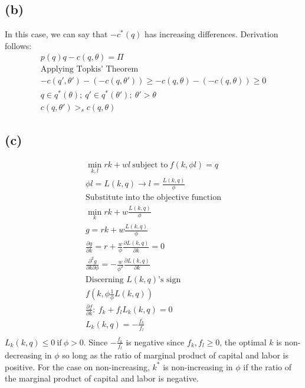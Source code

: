 \documentclass[10pt, a4paper]{article}
\begin{document}
    \subsection*{(b)}
      In this case, we can say that $-c^*(q)$ has increasing differences. Derivation follows:
      \begin{gather*}
        p(q)q - c(q,\theta) = \Pi \\
        \text{Applying Topkis' Theorem} \\
        -c(q',\theta')-(-c(q,\theta')) \geq -c(q,\theta)-(-c(q,\theta)) \geq 0 \\
        q\in q^*(\theta); \ q'\in q^*(\theta'); \ \theta' > \theta \\
        c(q,\theta') >_s c(q,\theta)
      \end{gather*}
    \subsection*{(c)}
      \begin{gather*}
        \min_{k,l} rk+wl \ \text{subject to} \ f(k,\phi l) = q \\
        \phi l = L(k,q) \rightarrow l = \frac{L(k,q)}{\phi} \\
        \text{Substitute into the objective function} \\
        \min_{k} rk + w\frac{L(k,q)}{\phi} \\
        g = rk + w\frac{L(k,q)}{\phi} \\
        \frac{\partial g}{\partial k} = r + \frac{w}{\phi}\frac{\partial L(k,q)}{\partial k} = 0 \\
        \frac{\partial^2 g}{\partial k\partial \phi} = -\frac{w}{\phi^2}\frac{\partial L(k,q)}{\partial k} \\
        \text{Discerning $L(k,q)$'s sign} \\
        f(k,\phi\frac{1}{\phi}L(k,q)) \\
        \frac{\partial f}{\partial k}: \ f_k+ f_lL_k(k,q) = 0 \\
        L_k(k,q) = -\frac{f_k}{f_l} \\
      \end{gather*}
      $L_k(k,q) \leq 0 \ \text{if} \ \phi>0$. Since $-\frac{f_k}{f_l}$ is negative since $f_k, f_l\geq0$, 
      the optimal $k$ is non-decreasing in $\phi$ so long as the ratio of marginal product of capital and 
      labor is positive.
      For the case on non-increasing, $k^*$ is non-increasing in $\phi$ if the ratio of the marginal 
      product of capital and labor is negative.
\end{document}
